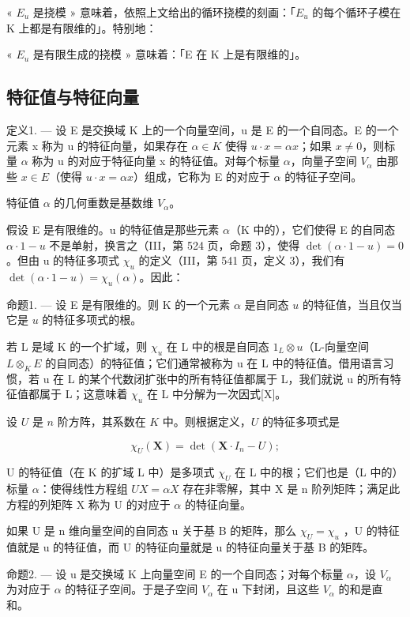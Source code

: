 « \(E_{u}\) 是挠模 » 意味着，依照上文给出的循环挠模的刻画：「\(E_{u}\) 的每个循环子模在 K 上都是有限维的」。特别地：

« \(E_{u}\) 是有限生成的挠模 » 意味着：「E 在 K 上是有限维的」。

\subsection{特征值与特征向量}

定义1. --- 设 E 是交换域 K 上的一个向量空间，u 是 E 的一个自同态。E 的一个元素 x 称为 u 的特征向量，如果存在 \(\alpha \in K\) 使得 \(u \cdot x = \alpha x\)；如果 \(x \neq 0\)，则标量 \(\alpha\) 称为 u 的对应于特征向量 x 的特征值。对每个标量 \(\alpha\)，向量子空间 \(V_{\alpha}\) 由那些 \(x \in E\)（使得 \(u \cdot x = \alpha x\)）组成，它称为 E 的对应于 \(\alpha\) 的特征子空间。

特征值 \(\alpha\) 的几何重数是基数维 \(V_{\alpha}\)。

假设 E 是有限维的。u 的特征值是那些元素 \(\alpha\)（K 中的），它们使得 E 的自同态 \(\alpha \cdot 1 - u\) 不是单射，换言之（III，第 524 页，命题 3），使得 \(\det(\alpha \cdot 1 - u) = 0\)。但由 u 的特征多项式 \(\chi_{u}\) 的定义（III，第 541 页，定义 3），我们有 \(\det(\alpha \cdot 1 - u) = \chi_{u}(\alpha)\)。因此：

命题1. --- 设 E 是有限维的。则 K 的一个元素 \(\alpha\) 是自同态 \(u\) 的特征值，当且仅当它是 \(u\) 的特征多项式的根。

若 L 是域 K 的一个扩域，则 \(\chi_{u}\) 在 L 中的根是自同态 \(1_{L} \otimes u\)（L-向量空间 \(L \otimes_{K} E\) 的自同态）的特征值；它们通常被称为 u 在 L 中的特征值。借用语言习惯，若 u 在 L 的某个代数闭扩张中的所有特征值都属于 L，我们就说 u 的所有特征值都属于 L；这意味着 \(\chi_{u}\) 在 L 中分解为一次因式{[}X{]}。

设 \(U\) 是 \(n\) 阶方阵，其系数在 \(K\) 中。则根据定义，\(U\) 的特征多项式是

\[
\chi_ {U} (\mathbf {X}) = \det \left(\mathbf {X} \cdot I _ {n} - U\right);
\]

U 的特征值（在 K 的扩域 L 中）是多项式 \(\chi_{U}\) 在 L 中的根；它们也是（L 中的）标量 \(\alpha\)：使得线性方程组 \(UX = \alpha X\) 存在非零解，其中 X 是 n 阶列矩阵；满足此方程的列矩阵 X 称为 U 的对应于 \(\alpha\) 的特征向量。

如果 U 是 n 维向量空间的自同态 u 关于基 B 的矩阵，那么 \(\chi_{U} = \chi_{u}\) ，U 的特征值就是 u 的特征值，而 U 的特征向量就是 u 的特征向量关于基 B 的矩阵。

命题2. --- 设 u 是交换域 K 上向量空间 E 的一个自同态；对每个标量 \(\alpha\)，设 \(V_{\alpha}\) 为对应于 \(\alpha\) 的特征子空间。于是子空间 \(V_{\alpha}\) 在 u 下封闭，且这些 \(V_{\alpha}\) 的和是直和。

